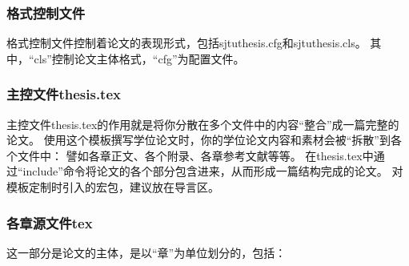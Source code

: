


\subsubsection{格式控制文件}
\label{sec:format}

格式控制文件控制着论文的表现形式，包括sjtuthesis.cfg和sjtuthesis.cls。
其中，“cls”控制论文主体格式，“cfg”为配置文件。

\subsubsection{主控文件thesis.tex}
\label{sec:thesistex}

主控文件thesis.tex的作用就是将你分散在多个文件中的内容“整合”成一篇完整的论文。
使用这个模板撰写学位论文时，你的学位论文内容和素材会被“拆散”到各个文件中：
譬如各章正文、各个附录、各章参考文献等等。
在thesis.tex中通过“include”命令将论文的各个部分包含进来，从而形成一篇结构完成的论文。
对模板定制时引入的宏包，建议放在导言区。

\subsubsection{各章源文件tex}
\label{sec:thesisbody}

这一部分是论文的主体，是以“章”为单位划分的，包括：

